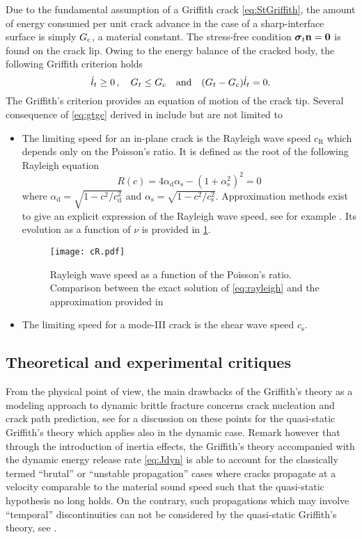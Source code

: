 Due to the fundamental assumption of a Griffith crack \eqref{eq:StGriffith}, the amount of energy consumed per unit crack advance in the case of a sharp-interface surface is simply $G_\mathrm{c}$, a material constant. The stress-free condition $\sig_t\vec{n}=\vec{0}$ is found on the crack lip. Owing to the energy balance of the cracked body, the following Griffith criterion holds
\begin{equation} \label{eq:gtgc}
\dot{l}_t\geq0\,,\quad G_t\leq G_\mathrm{c}\quad\text{and}\quad(G_t-G_\mathrm{c})\dot{l}_t=0.
\end{equation}
The Griffith's criterion provides an equation of motion of the crack tip. Several consequence of \eqref{eq:gtgc} derived in \cite{Freund:1990} include but are not limited to
\begin{itemize}
\item The limiting speed for an in-plane crack is the Rayleigh wave speed $c_\mathrm{R}$ which depends only on the Poisson's ratio. It is defined as the root of the following Rayleigh equation
\begin{equation} \label{eq:rayleigh}
R(c)=4\alpha_\mathrm{d}\alpha_\mathrm{s}-(1+\alpha_\mathrm{s}^2)^2=0
\end{equation}
where $\alpha_\mathrm{d}=\sqrt{1-c^2/c_\mathrm{d}^2}$ and $\alpha_\mathrm{s}=\sqrt{1-c^2/c_\mathrm{s}^2}$. Approximation methods exist to give an explicit expression of the Rayleigh wave speed, see for example \cite{RoyerClorennec:2007}. Its evolution as a function of $\nu$ is provided in \cref{fig:rayleigh}.
\begin{figure}[htbp]
\centering
\texttt{[image: cR.pdf]}
\caption{Rayleigh wave speed as a function of the Poisson's ratio. Comparison between the exact solution of \eqref{eq:rayleigh} and the approximation provided in \cite{RoyerClorennec:2007}} \label{fig:rayleigh}
\end{figure}

\item The limiting speed for a mode-III crack is the shear wave speed $c_\mathrm{s}$.
\end{itemize}

\subsection{Theoretical and experimental critiques} \label{sec:theoexpcrit}
From the physical point of view, the main drawbacks of the Griffith's theory as a modeling approach to dynamic brittle fracture concerns crack nucleation and crack path prediction, see \cite{FrancfortMarigo:1998} for a discussion on these points for the quasi-static Griffith's theory which applies also in the dynamic case. Remark however that through the introduction of inertia effects, the Griffith's theory accompanied with the dynamic energy release rate \eqref{eq:Jdyn} is able to account for the classically termed ``brutal'' or ``unstable propagation'' cases where cracks propagate at a velocity comparable to the material sound speed such that the quasi-static hypothesis no long holds. On the contrary, such propagations which may involve ``temporal'' discontinuities can not be considered by the quasi-static Griffith's theory, see \cite{FrancfortMarigo:1998}.

